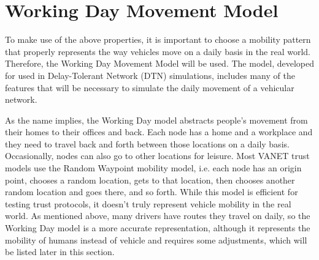 \section{Working Day Movement Model}

To make use of the above properties, it is important to choose a mobility pattern that properly represents the way vehicles move on a daily basis in the real world.
Therefore, the Working Day Movement Model \cite{ekman2008working} will be used.
The model, developed for used in Delay-Tolerant Network (DTN) simulations, includes many of the features that will be necessary to simulate the daily movement of a vehicular network.

As the name implies, the Working Day model abstracts people's movement from their homes to their offices and back.
Each node has a home and a workplace and they need to travel back and forth between those locations on a daily basis.
Occasionally, nodes can also go to other locations for leisure.
Most VANET trust models use the Random Waypoint mobility model, i.e. each node has an origin point, chooses a random location, gets to that location, then chooses another random location and goes there, and so forth.
While this model is efficient for testing trust protocols, it doesn't truly represent vehicle mobility in the real world.
As mentioned above, many drivers have routes they travel on daily, so the Working Day model is a more accurate representation, although it represents the mobility of humans instead of vehicle and requires some adjustments, which will be listed later in this section.


